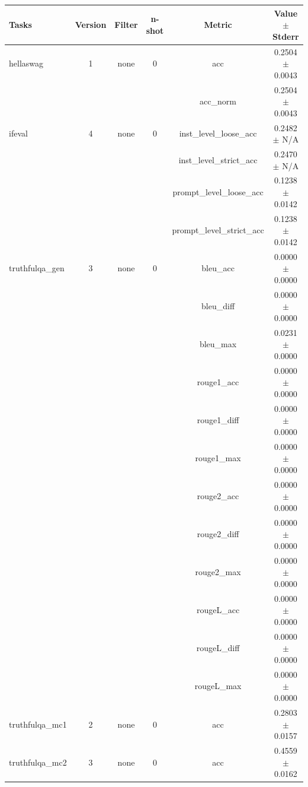 \documentclass{ifacconf}
\begin{document}
\vfill
\clearpage
\pagebreak

\begin{strip}
\begin{minipage}{\textwidth}
\begin{table}[H]
    \centering
    \begin{tabular}{|l|c|c|c|c|c|}
    \hline
    \textbf{Tasks} & \textbf{Version} & \textbf{Filter} & \textbf{n-shot} & \textbf{Metric} & \textbf{Value} $\pm$ \textbf{Stderr} \\ \hline
    hellaswag & 1 & none & 0 & acc & 0.2504 $\pm$ 0.0043 \\ \hline
    & & & & acc\_norm & 0.2504 $\pm$ 0.0043 \\ \hline
    ifeval & 4 & none & 0 & inst\_level\_loose\_acc & 0.2482 $\pm$ N/A \\ \hline
    & & & & inst\_level\_strict\_acc & 0.2470 $\pm$ N/A \\ \hline
    & & & & prompt\_level\_loose\_acc & 0.1238 $\pm$ 0.0142 \\ \hline
    & & & & prompt\_level\_strict\_acc & 0.1238 $\pm$ 0.0142 \\ \hline
    truthfulqa\_gen & 3 & none & 0 & bleu\_acc & 0.0000 $\pm$ 0.0000 \\ \hline
    & & & & bleu\_diff & 0.0000 $\pm$ 0.0000 \\ \hline
    & & & & bleu\_max & 0.0231 $\pm$ 0.0000 \\ \hline
    & & & & rouge1\_acc & 0.0000 $\pm$ 0.0000 \\ \hline
    & & & & rouge1\_diff & 0.0000 $\pm$ 0.0000 \\ \hline
    & & & & rouge1\_max & 0.0000 $\pm$ 0.0000 \\ \hline
    & & & & rouge2\_acc & 0.0000 $\pm$ 0.0000 \\ \hline
    & & & & rouge2\_diff & 0.0000 $\pm$ 0.0000 \\ \hline
    & & & & rouge2\_max & 0.0000 $\pm$ 0.0000 \\ \hline
    & & & & rougeL\_acc & 0.0000 $\pm$ 0.0000 \\ \hline
    & & & & rougeL\_diff & 0.0000 $\pm$ 0.0000 \\ \hline
    & & & & rougeL\_max & 0.0000 $\pm$ 0.0000 \\ \hline
    truthfulqa\_mc1 & 2 & none & 0 & acc & 0.2803 $\pm$ 0.0157 \\ \hline
    truthfulqa\_mc2 & 3 & none & 0 & acc & 0.4559 $\pm$ 0.0162 \\ \hline
    \end{tabular}
    \label{tab:gemma2_q4km}
    \end{table}


\end{minipage}
\end{strip}
\end{document}
